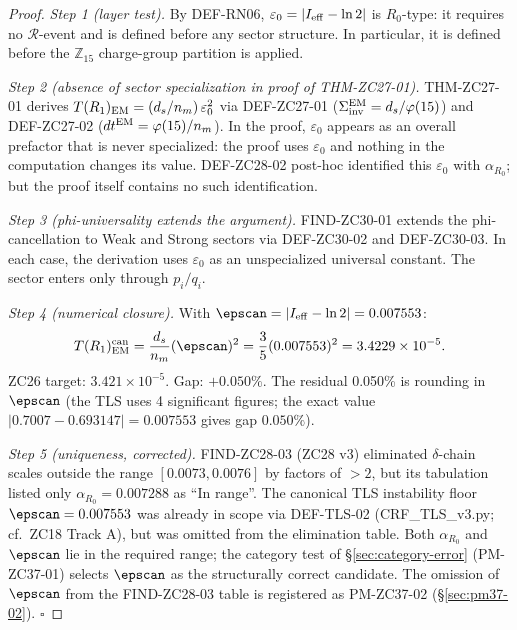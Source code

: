 \documentclass[12pt, a4paper]{article}
\begin{document}
\begin{proof}
\textit{Step 1 (layer test).}
By DEF-RN06, $\varepsilon_0 = |I_{\rm eff} - \ln 2|$ is
$R_0$-type: it requires no $\mathcal{R}$-event and is defined
before any sector structure. In particular, it is defined
before the $\mathbb{Z}_{15}$ charge-group partition is applied.

\textit{Step 2 (absence of sector specialization in
proof of THM-ZC27-01).}
THM-ZC27-01 derives $T(R_1)_{\rm EM} = (d_s/n_m)\,\varepsilon_0^2$
via DEF-ZC27-01 ($\Sigma_{\rm inv}^{\rm EM} = d_s/\varphi(15)$)
and DEF-ZC27-02 ($dt^{\rm EM} = \varphi(15)/n_m$). In the
proof, $\varepsilon_0$ appears as an overall prefactor that is
never specialized: the proof uses $\varepsilon_0$ and nothing
in the computation changes its value. DEF-ZC28-02 post-hoc
identified this $\varepsilon_0$ with $\alpha_{R_0}$; but the
proof itself contains no such identification.

\textit{Step 3 (phi-universality extends the argument).}
FIND-ZC30-01 extends the phi-cancellation to Weak and Strong
sectors via DEF-ZC30-02 and DEF-ZC30-03. In each case, the
derivation uses $\varepsilon_0$ as an unspecialized universal
constant. The sector enters only through $p_i/q_i$.

\textit{Step 4 (numerical closure).}
With $\epscan = |I_{\rm eff} - \ln 2| = 0.007553$:
\[
  T(R_1)_{\rm EM}^{\rm can}
  = \frac{d_s}{n_m}(\epscan)^2
  = \frac{3}{5}(0.007553)^2
  = 3.4229\times10^{-5}.
\]
ZC26 target: $3.421\times10^{-5}$. Gap: $+0.050\%$.
The residual 0.050\% is rounding in $\epscan$ (the TLS
uses 4 significant figures; the exact value
$|0.7007 - 0.693147| = 0.007553$ gives gap $0.050\%$).

\textit{Step 5 (uniqueness, corrected).}
FIND-ZC28-03 (ZC28 v3) eliminated $\delta$-chain scales
outside the range $[0.0073, 0.0076]$ by factors of $>2$, but
its tabulation listed only $\alpha_{R_0} = 0.007288$ as
``In range''. The canonical TLS instability floor
$\epscan = 0.007553$ was already in scope via DEF-TLS-02
(CRF\_TLS\_v3.py; cf.\ ZC18 Track A), but was omitted from
the elimination table. Both $\alpha_{R_0}$ and $\epscan$
lie in the required range; the category test of
\S\ref{sec:category-error} (PM-ZC37-01) selects $\epscan$
as the structurally correct candidate. The omission of
$\epscan$ from the FIND-ZC28-03 table is registered as
PM-ZC37-02 (\S\ref{sec:pm37-02}). \hfill$\square$
\end{proof}
\end{document}
